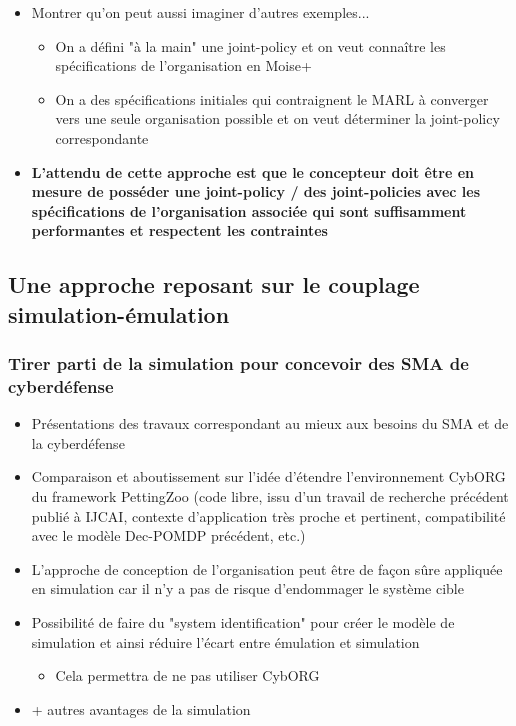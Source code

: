 \begin{itemize}
\begin{itemize}
\begin{itemize}
                    \end{itemize}
          \end{itemize}
    \item Montrer qu'on peut aussi imaginer d'autres exemples...
          \begin{itemize}
              \item On a défini "à la main" une joint-policy et on veut connaître les spécifications de l'organisation en Moise+
              \item On a des spécifications initiales qui contraignent le MARL à converger vers une seule organisation possible et on veut déterminer la joint-policy correspondante
          \end{itemize}
    \item \textbf{L'attendu de cette approche est que le concepteur doit être en mesure de posséder une joint-policy / des joint-policies avec les spécifications de l'organisation associée qui sont suffisamment performantes et respectent les contraintes}
\end{itemize}

\subsection{Une approche reposant sur le couplage simulation-émulation}

\subsubsection{Tirer parti de la simulation pour concevoir des SMA de cyberdéfense}
\begin{itemize}

    \item Présentations des travaux correspondant au mieux aux besoins du SMA et de la cyberdéfense
    \item Comparaison et aboutissement sur l'idée d'étendre l'environnement CybORG du framework PettingZoo (code libre, issu d'un travail de recherche précédent publié à IJCAI, contexte d'application très proche et pertinent, compatibilité avec le modèle Dec-POMDP précédent, etc.)
    \item L'approche de conception de l'organisation peut être de façon sûre appliquée en simulation car il n'y a pas de risque d'endommager le système cible
    \item Possibilité de faire du "system identification" pour créer le modèle de simulation et ainsi réduire l'écart entre émulation et simulation
          \begin{itemize}
              \item Cela permettra de ne pas utiliser CybORG
          \end{itemize}
    \item + autres avantages de la simulation
\end{itemize}

